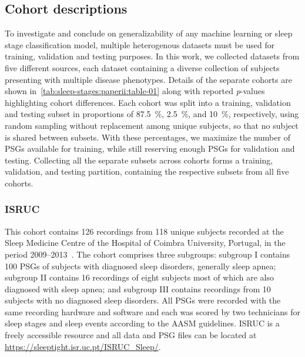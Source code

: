 \subsection{Cohort descriptions}
To investigate and conclude on generalizability of any machine learning or sleep stage classification model, multiple heterogenous datasets must be used for training, validation and testing purposes.
In this work, we collected datasets from five different sources, each dataset containing a diverse collection of subjects presenting with multiple disease phenotypes.
Details of the separate cohorts are shown in~\cref{tab:sleep-stages:paperii:table-01} along with reported \textit{p}-values highlighting cohort differences.
Each cohort was split into a training, validation and testing subset in proportions of \SI{87.5}{\percent}, \SI{2.5}{\percent}, and \SI{10}{\percent}, respectively, using random sampling without replacement among unique subjects, so that no subject is shared between subsets.
With these percentages, we maximize the number of \acp{PSG} available for training, while still reserving enough \acp{PSG} for validation and testing.
Collecting all the separate subsets across cohorts forms a training, validation, and testing partition, containing the respective subsets from all five cohorts. 

\subsubsection{\ac{ISRUC}}
This cohort contains 126 recordings from 118 unique subjects recorded at the Sleep Medicine Centre of the Hospital of Coimbra University, Portugal, in the period 2009–2013~\cite{Khalighi2016}.
The cohort comprises three subgroups: subgroup I contains 100 \acp{PSG} of subjects with diagnosed sleep disorders, generally sleep apnea; subgroup II contains 16 recordings of eight subjects most of which are also diagnosed with sleep apnea; and subgroup III contains recordings from 10 subjects with no diagnosed sleep disorders.
All \acp{PSG} were recorded with the same recording hardware and software and each was scored by two technicians for sleep stages and sleep events according to the \ac{AASM} guidelines.
\ac{ISRUC} is a freely accessible resource and all data and \ac{PSG} files can be located at \url{https://sleeptight.isr.uc.pt/ISRUC_Sleep/}.

